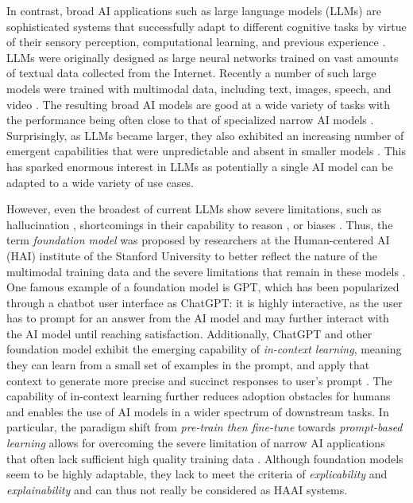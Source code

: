 In contrast, broad AI applications such as large language models (LLMs) are sophisticated systems that successfully
adapt to different cognitive tasks by virtue of their sensory perception, computational learning, and
previous experience \citep{hochreiterBroadAI2022}. LLMs were originally designed as large neural networks trained
on vast amounts of textual data collected from the Internet. Recently a number of such large models were trained
with multimodal data, including text, images, speech, and video \citep{bommasaniOpportunitiesRisksFoundation2022}.
The resulting broad AI models are good at a wide variety of tasks with the performance being often close to that of
specialized narrow AI models \citep{bommasaniOpportunitiesRisksFoundation2022}. Surprisingly, as LLMs became larger,
they also exhibited an increasing number of emergent capabilities that were unpredictable and absent in smaller models
\citep{weiEmergentAbilitiesLarge2022}. This has sparked enormous interest in LLMs as potentially a single AI model 
can be adapted to a wide variety of use cases. 

However, even the broadest of current LLMs show severe limitations, such
as hallucination \citep{jiSurveyHallucinationNatural2023}, shortcomings in their capability to reason 
\citep{bangMultitaskMultilingualMultimodal2023}, or biases \citep{tamkinUnderstandingCapabilitiesLimitations2021}.
Thus, the term \textit{foundation model} was proposed by researchers at the Human-centered AI (HAI) institute of the
Stanford University to better reflect the nature of the multimodal training data and the severe limitations that remain
in these models \citep{bommasaniOpportunitiesRisksFoundation2022}. One famous example of a foundation model is GPT, which
has been popularized through a chatbot user interface as ChatGPT: it is highly interactive, as the user has to prompt for 
an answer from the AI model and may further interact with the AI model until reaching satisfaction. Additionally, ChatGPT
and other foundation model exhibit the emerging capability of \textit{in-context learning}, meaning they can learn from a
small set of examples in the prompt, and apply that context to generate more precise and succinct responses to user's
prompt \citep{bommasaniOpportunitiesRisksFoundation2022}. The capability of in-context learning further reduces adoption
obstacles for humans and enables the use of AI models in a wider spectrum of downstream tasks. In particular, the paradigm
shift from \textit{pre-train then fine-tune} towards \textit{prompt-based learning} allows for overcoming the severe limitation
of narrow AI applications that often lack sufficient high quality training data \citep{zhouRevisitingAutomatedPrompting2023}.
Although foundation models seem to be highly adaptable, they lack to meet the criteria of \textit{explicability} and
\textit{explainability} and can thus not really be considered as HAAI systems.


